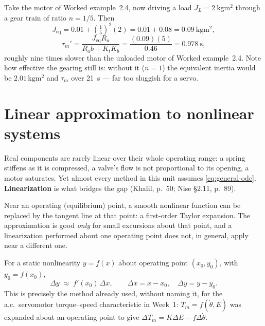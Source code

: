 \documentclass[11pt,a4paper]{article}
\begin{document}
\begin{workedex}[title=Worked example 2.5 --- geared servomotor]
Take the motor of Worked example~2.4, now driving a load
$J_L=\SI{2}{\kilogram\metre\squared}$ through a gear train of ratio
$n=1/5$. Then
\[
  J_{\text{eq}} = 0.01 + \left(\tfrac{1}{5}\right)^2(2) = 0.01+0.08
   = \SI{0.09}{\kilogram\metre\squared},
\]
\[
  \tau_m' = \frac{J_{\text{eq}}R_a}{R_ab+K_tK_b} = \frac{(0.09)(5)}{0.46}
   = \SI{0.978}{\second},
\]
roughly nine times slower than the unloaded motor of Worked example~2.4. Note
how effective the gearing still is: without it ($n=1$) the equivalent inertia
would be $2.01\,\si{\kilogram\metre\squared}$ and $\tau_m$ over
\SI{21}{\second} --- far too sluggish for a servo.
\end{workedex}

\section{Linear approximation to nonlinear systems}
\label{sec:linearization}

Real components are rarely linear over their whole operating range: a spring
stiffens as it is compressed, a valve's flow is not proportional to its
opening, a motor saturates. Yet almost every method in this unit assumes
\eqref{eq:general-ode}. \textbf{Linearization} is what bridges the gap
(Khalil, p.~50; Nise \S2.11, p.~89).

\begin{keyidea}
Near an operating (equilibrium) point, a smooth nonlinear function can be
replaced by the tangent line at that point: a first-order Taylor expansion.
The approximation is good \emph{only} for small excursions about that point,
and a linearization performed about one operating point does not, in general,
apply near a different one.
\end{keyidea}

For a static nonlinearity $y=f(x)$ about operating point $(x_0,y_0)$, with
$y_0=f(x_0)$,
\begin{equation}
  \Delta y \;\approx\; f'(x_0)\,\Delta x, \qquad \Delta x = x-x_0,\quad
  \Delta y = y-y_0 .
  \label{eq:lin-static}
\end{equation}
This is precisely the method already used, without naming it, for the a.c.\
servomotor torque--speed characteristic in Week~1: $T_m=f(\dot\theta,E)$ was
expanded about an operating point to give
$\Delta T_m=K\Delta E-f\Delta\dot\theta$.
\end{document}

